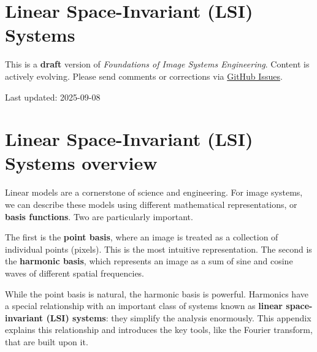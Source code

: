 \documentclass[
  letterpaper,
]{book}
\begin{document}
\chapter{Linear Space-Invariant (LSI)
Systems}\label{sec-appendix-spaceinvariance}

\begin{tcolorbox}[enhanced jigsaw, colframe=quarto-callout-warning-color-frame, titlerule=0mm, rightrule=.15mm, opacitybacktitle=0.6, colback=white, leftrule=.75mm, coltitle=black, title=\textcolor{quarto-callout-warning-color}{\faExclamationTriangle}\hspace{0.5em}{Work in Progress}, bottomrule=.15mm, colbacktitle=quarto-callout-warning-color!10!white, breakable, left=2mm, bottomtitle=1mm, toptitle=1mm, opacityback=0, arc=.35mm, toprule=.15mm]

This is a \textbf{draft} version of \emph{Foundations of Image Systems
Engineering}. Content is actively evolving. Please send comments or
corrections via \href{https://github.com/wandell/FISE-git/issues}{GitHub
Issues}.

Last updated: 2025-09-08

\end{tcolorbox}

\chapter{Linear Space-Invariant (LSI) Systems
overview}\label{sec-appendix-spaceinvariance-overview}

Linear models are a cornerstone of science and engineering. For image
systems, we can describe these models using different mathematical
representations, or \textbf{basis functions}. Two are particularly
important.

The first is the \textbf{point basis}, where an image is treated as a
collection of individual points (pixels). This is the most intuitive
representation. The second is the \textbf{harmonic basis}, which
represents an image as a sum of sine and cosine waves of different
spatial frequencies.

While the point basis is natural, the harmonic basis is powerful.
Harmonics have a special relationship with an important class of systems
known as \textbf{linear space-invariant (LSI) systems}: they simplify
the analysis enormously. This appendix explains this relationship and
introduces the key tools, like the Fourier transform, that are built
upon it.
\end{document}
